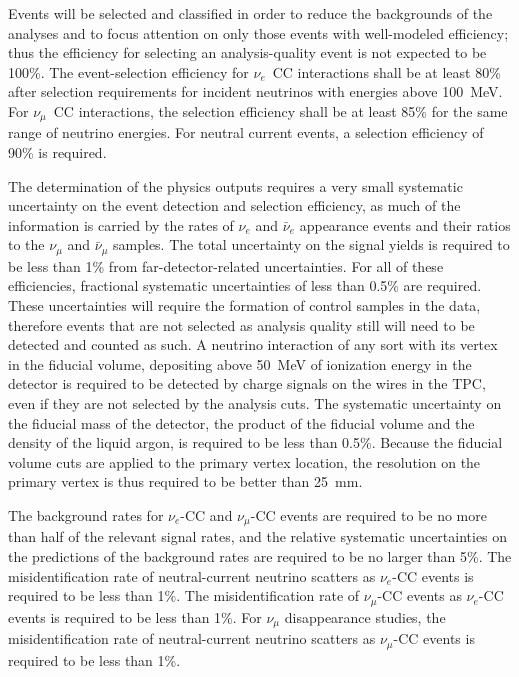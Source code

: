
Events will be selected and classified in order to reduce the
backgrounds of the analyses and to focus attention on only those
events with well-modeled efficiency; thus the efficiency for
selecting an analysis-quality event is not expected to be 100\%.  The
event-selection efficiency for $\nu_e$~CC interactions shall be at
least 80\% after selection requirements for incident neutrinos with
energies above 100~MeV.  For $\nu_\mu$~CC interactions, the selection
efficiency shall be at least 85\% for the same range of neutrino
energies.  For neutral current events, a selection efficiency of 90\%
is required.

The determination of the physics outputs requires a very small
systematic uncertainty on the event detection and selection
efficiency, as much of the information is carried by the rates of
$\nu_e$ and $\bar\nu_e$ appearance events and their ratios to the
$\nu_\mu$ and $\bar\nu_\mu$ samples.  The total uncertainty on the
signal yields is required to be less than 1\% from
far-detector-related uncertainties.  For all of these efficiencies, 
fractional systematic uncertainties of less than 0.5\% are required.  These
uncertainties will require the formation of control samples in the
data, therefore events that are not selected as analysis quality still will
need to be detected and counted as such.  %
A neutrino
interaction of any sort with its vertex in the fiducial volume,
depositing above 50~MeV of ionization energy in the detector is required to be
detected by charge signals on the wires in the TPC, even if they are
not selected by the analysis cuts.  %
The systematic
uncertainty on the fiducial mass of the detector, the product of the
fiducial volume and the density of the liquid argon, %
is required to be less than
0.5\%.  Because the fiducial volume cuts are applied to the primary
vertex location, the resolution on the primary vertex is thus required
to be better than 25~mm.

The background rates for $\nu_e$-CC and $\nu_\mu$-CC events are required
to be no more than half of the relevant signal rates, and the relative
systematic uncertainties on the predictions of the background rates 
are required to be no larger than 5\%.  The misidentification
rate of neutral-current neutrino scatters as $\nu_e$-CC events is
required to be less than 1\%.  The misidentification rate of
$\nu_\mu$-CC events as $\nu_e$-CC events is required to be less than
1\%.  For $\nu_\mu$ disappearance studies, the misidentification rate
of neutral-current neutrino scatters as $\nu_\mu$-CC events is
required to be less than 1\%.

